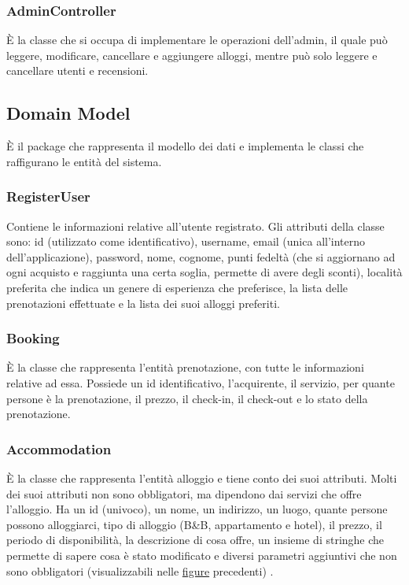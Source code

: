 \documentclass[10pt]{article}
\begin{document}
\subsubsection{AdminController}

\`E la classe che si occupa di implementare le operazioni dell'admin, il quale pu\`o leggere, modificare, cancellare e aggiungere alloggi, mentre pu\`o solo leggere e cancellare utenti e recensioni.
 
\subsection{Domain Model}

\`E il package che rappresenta il modello dei dati e implementa le classi che raffigurano le entit\`a del sistema.

\subsubsection{RegisterUser}

Contiene le informazioni relative all'utente registrato. Gli attributi della classe sono: id (utilizzato come identificativo), username, email (unica all'interno dell'applicazione), password, nome, cognome, punti fedelt\`a (che si aggiornano ad ogni acquisto e raggiunta una certa soglia, permette di avere degli sconti), localit\`a preferita che indica un genere di esperienza che preferisce, la lista delle prenotazioni effettuate e la lista dei suoi alloggi preferiti. 

\subsubsection{Booking}

\`E la classe che rappresenta l'entit\`a prenotazione, con tutte le informazioni relative ad essa. Possiede un id identificativo, l'acquirente, il servizio, per quante persone \`e la prenotazione, il prezzo, il check-in, il check-out e lo stato della prenotazione.

\subsubsection{Accommodation}

\`E la classe che rappresenta l'entit\`a alloggio e tiene conto dei suoi attributi. Molti dei suoi attributi non sono obbligatori, ma dipendono dai servizi che offre l'alloggio. Ha un id (univoco), un nome, un indirizzo, un luogo, quante persone possono alloggiarci, tipo di alloggio (B\&B, appartamento e hotel), il prezzo, il periodo di disponibilit\`a, la descrizione di cosa offre, un insieme di stringhe che permette di sapere cosa \`e stato modificato e diversi parametri aggiuntivi che non sono obbligatori (visualizzabili nelle \hyperref[domainmodel]{figure} precedenti) .
\end{document}
